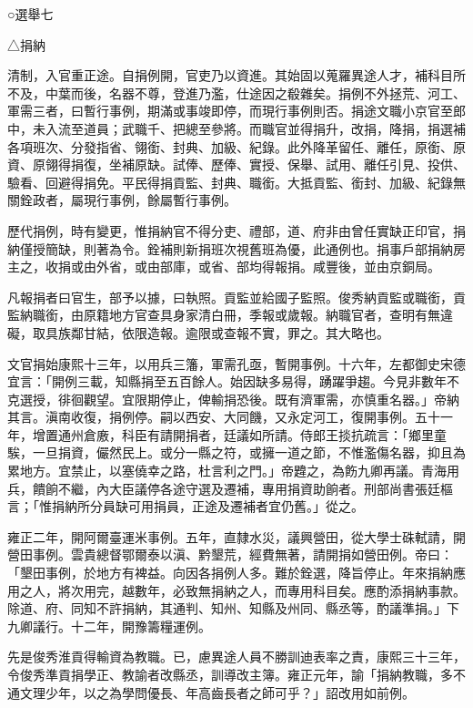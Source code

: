 
\begin{pinyinscope}
○選舉七

△捐納

清制，入官重正途。自捐例開，官吏乃以資進。其始固以蒐羅異途人才，補科目所不及，中葉而後，名器不尊，登進乃濫，仕途因之殽雜矣。捐例不外拯荒、河工、軍需三者，曰暫行事例，期滿或事竣即停，而現行事例則否。捐途文職小京官至郎中，未入流至道員；武職千、把總至參將。而職官並得捐升，改捐，降捐，捐選補各項班次、分發指省、翎銜、封典、加級、紀錄。此外降革留任、離任，原銜、原資、原翎得捐復，坐補原缺。試俸、歷俸、實授、保舉、試用、離任引見、投供、驗看、回避得捐免。平民得捐貢監、封典、職銜。大抵貢監、銜封、加級、紀錄無關銓政者，屬現行事例，餘屬暫行事例。

歷代捐例，時有變更，惟捐納官不得分吏、禮部，道、府非由曾任實缺正印官，捐納僅授簡缺，則著為令。銓補則新捐班次視舊班為優，此通例也。捐事戶部捐納房主之，收捐或由外省，或由部庫，或省、部均得報捐。咸豐後，並由京銅局。

凡報捐者曰官生，部予以據，曰執照。貢監並給國子監照。俊秀納貢監或職銜，貢監納職銜，由原籍地方官查具身家清白冊，季報或歲報。納職官者，查明有無違礙，取具族鄰甘結，依限造報。逾限或查報不實，罪之。其大略也。

文官捐始康熙十三年，以用兵三籓，軍需孔亟，暫開事例。十六年，左都御史宋德宜言：「開例三載，知縣捐至五百餘人。始因缺多易得，踴躍爭趨。今見非數年不克選授，徘徊觀望。宜限期停止，俾輸捐恐後。既有濟軍需，亦慎重名器。」帝納其言。滇南收復，捐例停。嗣以西安、大同饑，又永定河工，復開事例。五十一年，增置通州倉廒，科臣有請開捐者，廷議如所請。侍郎王掞抗疏言：「鄉里童騃，一旦捐資，儼然民上。或分一縣之符，或擁一道之節，不惟濫傷名器，抑且為累地方。宜禁止，以塞僥幸之路，杜言利之門。」帝韙之，為飭九卿再議。青海用兵，饋餉不繼，內大臣議停各途守選及遷補，專用捐資助餉者。刑部尚書張廷樞言；「惟捐納所分員缺可用捐員，正途及遷補者宜仍舊。」從之。

雍正二年，開阿爾臺運米事例。五年，直隸水災，議興營田，從大學士硃軾請，開營田事例。雲貴總督鄂爾泰以滇、黔墾荒，經費無著，請開捐如營田例。帝曰：「墾田事例，於地方有裨益。向因各捐例人多。難於銓選，降旨停止。年來捐納應用之人，將次用完，越數年，必致無捐納之人，而專用科目矣。應酌添捐納事款。除道、府、同知不許捐納，其通判、知州、知縣及州同、縣丞等，酌議準捐。」下九卿議行。十二年，開豫籌糧運例。

先是俊秀淮貢得輸資為教職。已，慮異途人員不勝訓迪表率之責，康熙三十三年，令俊秀準貢捐學正、教諭者改縣丞，訓導改主簿。雍正元年，諭「捐納教職，多不通文理少年，以之為學問優長、年高齒長者之師可乎？」詔改用如前例。


\end{pinyinscope}
